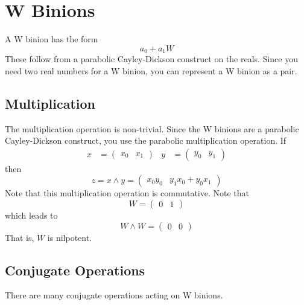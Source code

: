 \chapter{W Binions}
A W binion has the form
\begin{equation}
    a_{0} + a_{1} W
\end{equation}
These follow from a parabolic Cayley-Dickson construct on the reals. Since you need two real numbers for a W binion, you can represent a W binion as a pair.
\section{Multiplication}
The multiplication operation is non-trivial. Since the W binions are a parabolic Cayley-Dickson construct, you use the parabolic multiplication operation. If
\begin{align}
    x &= \begin{pmatrix}
        x_{0} & x_{1}
    \end{pmatrix} & y &= \begin{pmatrix}
        y_{0} & y_{1}
    \end{pmatrix}
\end{align}
then
\begin{equation}
    z = x \wedge y = \begin{pmatrix}
        x_{0} y_{0} & y_{1} x_{0} + y_{0} x_{1}
    \end{pmatrix}
\end{equation}
Note that this multiplication operation is commutative. Note that
\begin{equation}
    W = \begin{pmatrix}
        0 & 1
    \end{pmatrix}
\end{equation}
which leads to
\begin{equation}
    W \wedge W = \begin{pmatrix}
        0 & 0
    \end{pmatrix}
\end{equation}
That is, $W$ is nilpotent.
\section{Conjugate Operations}
There are many conjugate operations acting on W binions.
